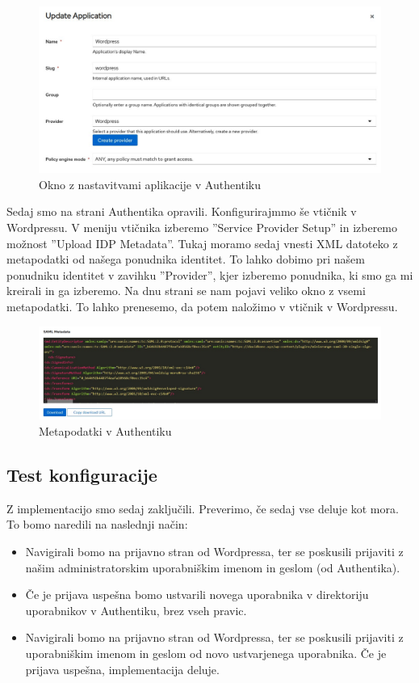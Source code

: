 \documentclass[a4paper,12pt,openright]{book}
\begin{document}
\begin{figure}[H]
\hspace{-2cm}
\includegraphics[scale=0.65]{diploma-FRI-vzorec_11maj2021/AuthAplication.jpg}
\caption{Okno z nastavitvami aplikacije v Authentiku}
\label{fig}
\end{figure}

Sedaj smo na strani Authentika opravili. Konfigurirajmmo še vtičnik v Wordpressu. V meniju vtičnika izberemo ''Service Provider Setup'' in izberemo možnost ''Upload IDP Metadata''. Tukaj moramo sedaj vnesti XML datoteko z metapodatki od našega ponudnika identitet. To lahko dobimo pri našem ponudniku identitet v zavihku ''Provider'', kjer izberemo ponudnika, ki smo ga mi kreirali in ga izberemo. Na dnu strani se nam pojavi veliko okno z vsemi metapodatki. To lahko prenesemo, da potem naložimo v vtičnik v Wordpressu. 

\begin{figure}[H]
\hspace{-4cm}
\includegraphics[scale=0.5]{diploma-FRI-vzorec_11maj2021/SAMLMetadata.jpg}
\caption{Metapodatki v Authentiku}
\label{fig}
\end{figure}

\subsection{Test konfiguracije}

Z implementacijo smo sedaj zaključili. Preverimo, če sedaj vse deluje kot mora. 
To bomo naredili na naslednji način:
\begin{itemize}
    \item Navigirali bomo na prijavno stran od Wordpressa, ter se poskusili prijaviti z našim administratorskim uporabniškim imenom in geslom (od Authentika). 
    \item Če je prijava uspešna bomo ustvarili novega uporabnika v direktoriju uporabnikov v Authentiku, brez vseh pravic. 
    \item Navigirali bomo na prijavno stran od Wordpressa, ter se poskusili prijaviti z uporabniškim imenom in geslom od novo ustvarjenega uporabnika. Če je prijava uspešna, implementacija deluje. 
\end{itemize}
\end{document}
